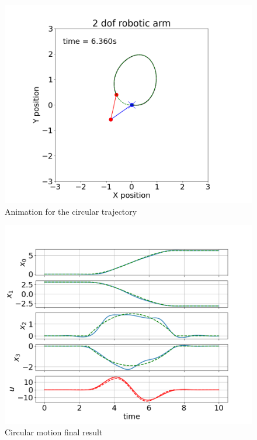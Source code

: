 \begin{figure}[H]
    \centering
    \includegraphics[width=0.8\linewidth]{figs/circle_video.png}
    \caption{Animation for the circular trajectory}
    \label{fig:swing_video}
\end{figure}

\begin{figure}[H]
    \centering
    \includegraphics[width=0.8\linewidth]{figs/circle_result.png}
    \caption{Circular motion final result}
    \label{fig:circle_result}
\end{figure}